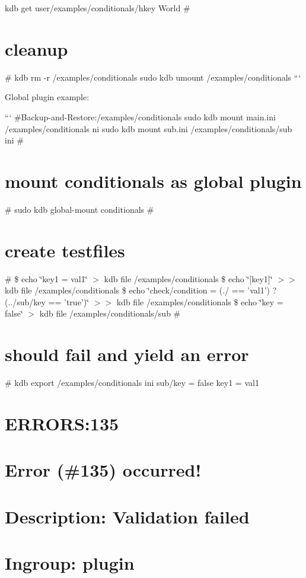 kdb get user/examples/conditionals/hkey World \# \section*{cleanup}

\# kdb rm -\/r /examples/conditionals sudo kdb umount /examples/conditionals ```

Global plugin example\+:

``` \#\+Backup-\/and-\/\+Restore\+:/examples/conditionals sudo kdb mount main.\+ini /examples/conditionals ni sudo kdb mount sub.\+ini /examples/conditionals/sub ini \# \section*{mount conditionals as global plugin}

\# sudo kdb global-\/mount conditionals \# \section*{create testfiles}

\# \$ echo \char`\"{}key1 = val1\char`\"{} $>$ {\ttfamily kdb file /examples/conditionals} \$ echo \char`\"{}\mbox{[}key1\mbox{]}\char`\"{} $>$$>$ {\ttfamily kdb file /examples/conditionals} \$ echo \char`\"{}check/condition = (./ == 'val1') ? (../sub/key == 'true')\char`\"{} $>$$>$ {\ttfamily kdb file /examples/conditionals} \$ echo \char`\"{}key = false\char`\"{} $>$ {\ttfamily kdb file /examples/conditionals/sub} \# \section*{should fail and yield an error}

\# kdb export /examples/conditionals ini sub/key = false key1 = val1 \section*{E\+R\+R\+O\+R\+S\+:135}

\section*{Error (\#135) occurred!}

\section*{Description\+: Validation failed}

\section*{Ingroup\+: plugin}

